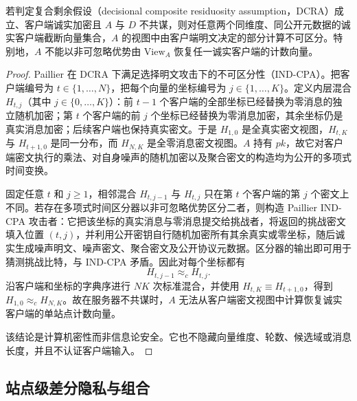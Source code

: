 \begin{theorem}[聚合服务器视图的计算机密性]
若判定复合剩余假设（decisional composite residuosity assumption，DCRA）成立、客户端诚实加密且 $A$ 与 $D$ 不共谋，则对任意两个同维度、同公开元数据的诚实客户端截断向量集合，$A$ 的视图中由客户端明文决定的部分计算不可区分。特别地，$A$ 不能以非可忽略优势由 $\mathrm{View}_A$ 恢复任一诚实客户端的计数向量。
\end{theorem}
\begin{proof}
Paillier 在 DCRA 下满足选择明文攻击下的不可区分性（IND-CPA）。把客户端编号为 $t\in\{1,\ldots,N\}$，把每个向量的坐标编号为 $j\in\{1,\ldots,K\}$。定义内层混合 $H_{t,j}$（其中 $j\in\{0,\ldots,K\}$）：前 $t-1$ 个客户端的全部坐标已经替换为零消息的独立随机加密；第 $t$ 个客户端的前 $j$ 个坐标已经替换为零消息加密，其余坐标仍是真实消息加密；后续客户端也保持真实密文。于是 $H_{1,0}$ 是全真实密文视图，$H_{t,K}$ 与 $H_{t+1,0}$ 是同一分布，而 $H_{N,K}$ 是全零消息密文视图。$A$ 持有 $pk$，故它对客户端密文执行的乘法、对自身噪声的随机加密以及聚合密文的构造均为公开的多项式时间变换。

固定任意 $t$ 和 $j\geq1$，相邻混合 $H_{t,j-1}$ 与 $H_{t,j}$ 只在第 $t$ 个客户端的第 $j$ 个密文上不同。若存在多项式时间区分器以非可忽略优势区分二者，则构造 Paillier IND-CPA 攻击者：它把该坐标的真实消息与零消息提交给挑战者，将返回的挑战密文填入位置 $(t,j)$，并利用公开密钥自行随机加密所有其余真实或零坐标，随后诚实生成噪声明文、噪声密文、聚合密文及公开协议元数据。区分器的输出即可用于猜测挑战比特，与 IND-CPA 矛盾。因此对每个坐标都有
\begin{equation}
 H_{t,j-1}\approx_c H_{t,j}.
 \label{eq:nested-hybrid}
\end{equation}
沿客户端和坐标的字典序进行 $NK$ 次标准混合，并使用 $H_{t,K}\equiv H_{t+1,0}$，得到 $H_{1,0}\approx_c H_{N,K}$。故在服务器不共谋时，$A$ 无法从客户端密文视图中计算恢复诚实客户端的单站点计数向量。

该结论是计算机密性而非信息论安全。它也不隐藏向量维度、轮数、候选域或消息长度，并且不认证客户端输入。
\end{proof}

\subsection{站点级差分隐私与组合}

